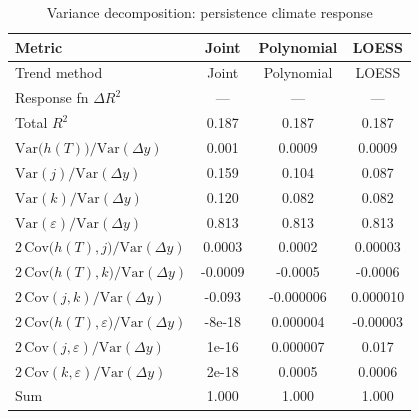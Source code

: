 \begin{table}[htbp]
\centering
\caption{Variance decomposition: persistence climate response}
\label{tab:variance_decomp_persistence}

\small
\begin{tabular}{@{}lccc@{}}
\toprule
Metric & Joint & Polynomial & LOESS \\
\midrule
Trend method & Joint & Polynomial & LOESS \\
\midrule
Response fn $\Delta R^2$ & — & — & — \\
Total $R^2$ & 0.187 & 0.187 & 0.187 \\
\midrule
$\mathrm{Var}\!\big(h(T)\big)/\mathrm{Var}(\Delta y)$ & 0.001 & 0.0009 & 0.0009 \\
$\mathrm{Var}(j)/\mathrm{Var}(\Delta y)$ & 0.159 & 0.104 & 0.087 \\
$\mathrm{Var}(k)/\mathrm{Var}(\Delta y)$ & 0.120 & 0.082 & 0.082 \\
$\mathrm{Var}(\varepsilon)/\mathrm{Var}(\Delta y)$ & 0.813 & 0.813 & 0.813 \\
\midrule
$2\,\mathrm{Cov}\!\big(h(T),j\big)/\mathrm{Var}(\Delta y)$ & 0.0003 & 0.0002 & 0.00003 \\
$2\,\mathrm{Cov}\!\big(h(T),k\big)/\mathrm{Var}(\Delta y)$ & -0.0009 & -0.0005 & -0.0006 \\
$2\,\mathrm{Cov}(j,k)/\mathrm{Var}(\Delta y)$ & -0.093 & -0.000006 & 0.000010 \\
$2\,\mathrm{Cov}\!\big(h(T),\varepsilon\big)/\mathrm{Var}(\Delta y)$ & -8e-18 & 0.000004 & -0.00003 \\
$2\,\mathrm{Cov}(j,\varepsilon)/\mathrm{Var}(\Delta y)$ & 1e-16 & 0.000007 & 0.017 \\
$2\,\mathrm{Cov}(k,\varepsilon)/\mathrm{Var}(\Delta y)$ & 2e-18 & 0.0005 & 0.0006 \\
\midrule
Sum & 1.000 & 1.000 & 1.000 \\
\bottomrule
\end{tabular}
\end{table}